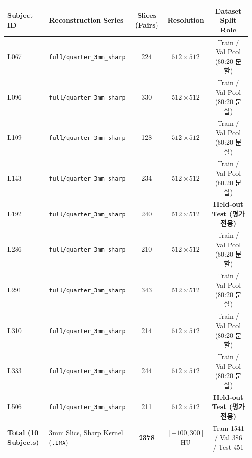 \begin{tabular}{llccc}
\toprule
\textbf{Subject ID} & \textbf{Reconstruction Series} & \textbf{Slices (Pairs)} & \textbf{Resolution} & \textbf{Dataset Split Role} \\
\midrule
L067 & \texttt{full/quarter\_3mm\_sharp} & 224 & $512\times 512$ & Train / Val Pool (80:20 분할) \\
L096 & \texttt{full/quarter\_3mm\_sharp} & 330 & $512\times 512$ & Train / Val Pool (80:20 분할) \\
L109 & \texttt{full/quarter\_3mm\_sharp} & 128 & $512\times 512$ & Train / Val Pool (80:20 분할) \\
L143 & \texttt{full/quarter\_3mm\_sharp} & 234 & $512\times 512$ & Train / Val Pool (80:20 분할) \\
L192 & \texttt{full/quarter\_3mm\_sharp} & 240 & $512\times 512$ & \textbf{Held-out Test (평가 전용)} \\
L286 & \texttt{full/quarter\_3mm\_sharp} & 210 & $512\times 512$ & Train / Val Pool (80:20 분할) \\
L291 & \texttt{full/quarter\_3mm\_sharp} & 343 & $512\times 512$ & Train / Val Pool (80:20 분할) \\
L310 & \texttt{full/quarter\_3mm\_sharp} & 214 & $512\times 512$ & Train / Val Pool (80:20 분할) \\
L333 & \texttt{full/quarter\_3mm\_sharp} & 244 & $512\times 512$ & Train / Val Pool (80:20 분할) \\
L506 & \texttt{full/quarter\_3mm\_sharp} & 211 & $512\times 512$ & \textbf{Held-out Test (평가 전용)} \\
\midrule
\textbf{Total (10 Subjects)} & 3mm Slice, Sharp Kernel (\texttt{.IMA}) & \textbf{2378} & $[-100, 300]$ HU & Train 1541 / Val 386 / Test 451 \\
\bottomrule
\end{tabular}
